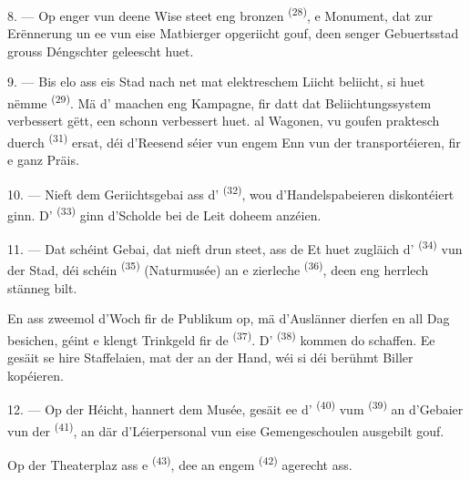 8. --- Op enger vun deene Wise steet eng bronzen  \textsuperscript{(28)},
e Monument, dat zur Erënnerung un ee vun eise Matbierger opgeriicht gouf, deen
senger Gebuertsstad grouss Déngschter geleescht huet.

\VUsaut{4.0mm}
\VUsaut{3.4mm}

9. --- Bis elo ass eis Stad nach net mat elektreschem Liicht beliicht, si huet nëmme
 \textsuperscript{(29)}. Mä d' maachen eng
Kampagne, fir datt dat Beliichtungssystem verbessert gëtt,  een schonn
 verbessert huet.  al Wagonen,
 vu  goufen praktesch duerch 
\textsuperscript{(31)} ersat, déi d'Reesend séier vun engem Enn vun der
 transportéieren, fir e ganz 
Präis.

10. --- Nieft dem Geriichtsgebai ass d' \textsuperscript{(32)}, wou
d'Handelspabeieren diskontéiert ginn. D' \textsuperscript{(33)}
ginn d'Scholde bei de Leit doheem anzéien.

\VUsaut{4.0mm}
\VUsaut{3.4mm}

11. --- Dat schéint Gebai, dat nieft drun steet, ass de  Et huet
zugläich d' \textsuperscript{(34)} vun der Stad, déi schéin
 \textsuperscript{(35)} (Naturmusée) an e
zierleche  \textsuperscript{(36)}, deen eng herrlech stänneg
 bilt.

En ass zweemol d'Woch fir de Publikum op, mä d'Auslänner dierfen en all Dag besichen,
géint e klengt Trinkgeld fir de  \textsuperscript{(37)}. D'
\textsuperscript{(38)} kommen do schaffen. Ee gesäit se  hire
Staffelaien, mat der  an der Hand, wéi si déi berühmt Biller
kopéieren.

12. --- Op der Héicht, hannert dem Musée, gesäit ee d'
\textsuperscript{(40)} vum  \textsuperscript{(39)} an d'Gebaier vun der
 \textsuperscript{(41)}, an där d'Léierpersonal vun eise
Gemengeschoulen ausgebilt gouf.

Op der Theaterplaz ass e  \textsuperscript{(43)}, dee an engem
 \textsuperscript{(42)} agerecht ass.

